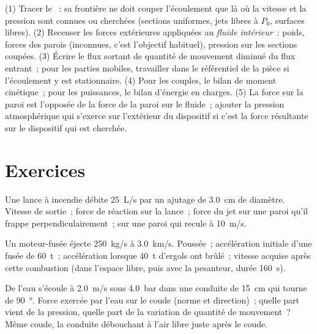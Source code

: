 \begin{method}\label{met:b2:flow-balances:method}
(1) Tracer le ~: sa frontière ne doit couper l'écoulement que
là où la vitesse et la pression sont connues ou cherchées (sections uniformes,
jets libres à $P_0$, surfaces libres). (2) Recenser les forces extérieures appliquées au
\emph{fluide intérieur}~: poids, forces des parois (inconnues, c'est l'objectif habituel),
pression sur les sections coupées. (3) Écrire le flux sortant de quantité de mouvement diminué du flux entrant~;
pour les parties mobiles, travailler dans le référentiel de la pièce si l'écoulement y est
stationnaire. (4) Pour les couples, le bilan de moment cinétique~; pour les puissances,
le bilan d'énergie en charges. (5) La force sur la paroi est l'opposée de la force
de la paroi sur le fluide~; ajouter la pression atmosphérique qui s'exerce sur
l'extérieur du dispositif si c'est la force résultante sur le dispositif qui est cherchée.
\end{method}

\section{Exercices}

\begin{exercise}[$\star$]\label{exo:b2:flow-balances:1}
Une lance à incendie débite \qty{25}{L/s} par un ajutage de \qty{3.0}{cm}
de diamètre. Vitesse de sortie~; force de réaction sur la lance~; force du jet
sur une paroi qu'il frappe perpendiculairement~; sur une paroi qui recule à \qty{10}{m/s}.
\end{exercise}

\begin{exercise}[$\star$]\label{exo:b2:flow-balances:2}
Un moteur-fusée éjecte \qty{250}{kg/s} à \qty{3.0}{km/s}. Poussée~; accélération
initiale d'une fusée de \qty{60}{t}~; accélération lorsque \qty{40}{t} d'ergols
ont brûlé~; vitesse acquise après cette combustion (dans l'espace libre, puis
avec la pesanteur, durée \qty{160}{s}).
\end{exercise}

\begin{exercise}[$\star$]\label{exo:b2:flow-balances:3}
De l'eau s'écoule à \qty{2.0}{m/s} sous \qty{4.0}{bar} dans une conduite de \qty{15}{cm} qui
tourne de \qty{90}{\degree}. Force exercée par l'eau sur le coude
(norme et direction)~; quelle part vient de la pression, quelle part
de la variation de quantité de mouvement~? Même coude, la conduite débouchant à l'air libre juste
après le coude.
\end{exercise}

